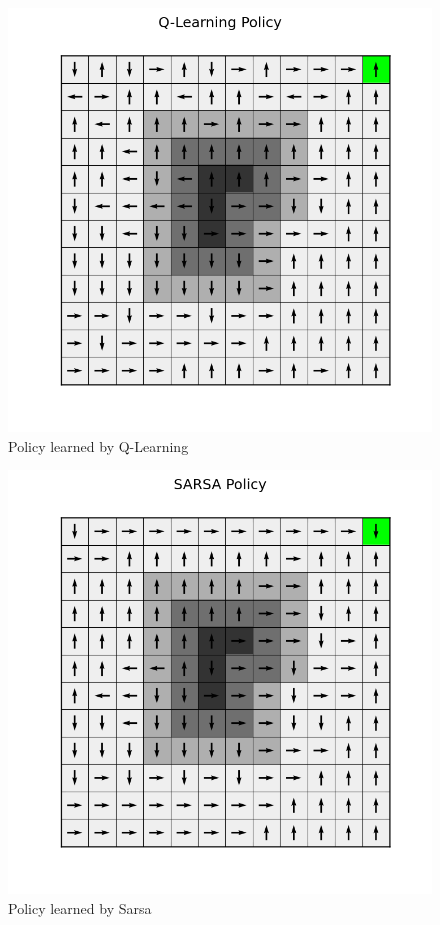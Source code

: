 \documentclass[a4paper]{article}
\begin{document}
\begin{figure}[htbp!]
\center
\includegraphics[scale=0.75]{A/Q-Learning-policy.png}
\caption{Policy learned by Q-Learning}
\end{figure}

\begin{figure}[htbp!]
\center
\includegraphics[scale=0.75]{A/SARSA-policy.png}
\caption{Policy learned by Sarsa}
\end{figure}
\end{document}
